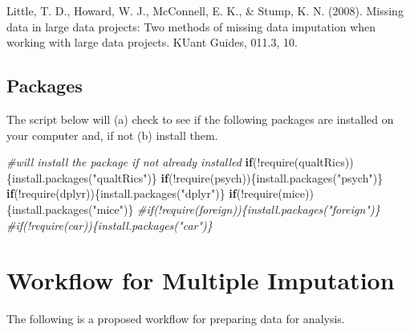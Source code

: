 \documentclass[
  11pt,
]{book}
\newenvironment{Shaded}{\begin{snugshade}}{\end{snugshade}}
\newcommand{\CommentTok}[1]{\textcolor[rgb]{0.56,0.35,0.01}{\textit{#1}}}
\newcommand{\ControlFlowTok}[1]{\textcolor[rgb]{0.13,0.29,0.53}{\textbf{#1}}}
\newcommand{\FunctionTok}[1]{\textcolor[rgb]{0.00,0.00,0.00}{#1}}
\newcommand{\NormalTok}[1]{#1}
\newcommand{\SpecialCharTok}[1]{\textcolor[rgb]{0.00,0.00,0.00}{#1}}
\newcommand{\StringTok}[1]{\textcolor[rgb]{0.31,0.60,0.02}{#1}}
\begin{document}
Little, T. D., Howard, W. J., McConnell, E. K., \& Stump, K. N. (2008). Missing data in large data projects: Two methods of missing data imputation when working with large data projects. KUant Guides, 011.3, 10.

\hypertarget{packages-4}{%
\subsection{Packages}\label{packages-4}}

The script below will (a) check to see if the following packages are installed on your computer and, if not (b) install them.

\begin{Shaded}
\begin{Highlighting}[]
\CommentTok{\#will install the package if not already installed}
\ControlFlowTok{if}\NormalTok{(}\SpecialCharTok{!}\FunctionTok{require}\NormalTok{(qualtRics))\{}\FunctionTok{install.packages}\NormalTok{(}\StringTok{"qualtRics"}\NormalTok{)\}}
\ControlFlowTok{if}\NormalTok{(}\SpecialCharTok{!}\FunctionTok{require}\NormalTok{(psych))\{}\FunctionTok{install.packages}\NormalTok{(}\StringTok{"psych"}\NormalTok{)\}}
\ControlFlowTok{if}\NormalTok{(}\SpecialCharTok{!}\FunctionTok{require}\NormalTok{(dplyr))\{}\FunctionTok{install.packages}\NormalTok{(}\StringTok{"dplyr"}\NormalTok{)\}}
\ControlFlowTok{if}\NormalTok{(}\SpecialCharTok{!}\FunctionTok{require}\NormalTok{(mice))\{}\FunctionTok{install.packages}\NormalTok{(}\StringTok{"mice"}\NormalTok{)\}}
\CommentTok{\#if(!require(foreign))\{install.packages("foreign")\}}
\CommentTok{\#if(!require(car))\{install.packages("car")\}}
\end{Highlighting}
\end{Shaded}

\hypertarget{workflow-for-multiple-imputation}{%
\section{Workflow for Multiple Imputation}\label{workflow-for-multiple-imputation}}

The following is a proposed workflow for preparing data for analysis.
\end{document}
